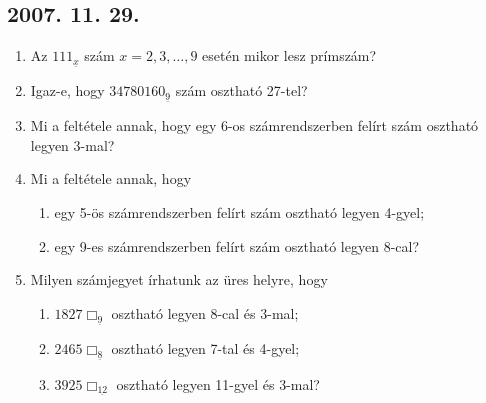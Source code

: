 \documentclass{article}
\newenvironment{abc}{\begin{enumerate}[label=\textit{\alph*})]}{\end{enumerate}}
\begin{document}
\subsection*{2007. 11. 29.}
\begin{enumerate}
\item Az $111_{\underline{x}}$ szám $x=2, 3, \ldots , 9$ esetén mikor lesz prímszám?
\item Igaz-e, hogy $34780160_{\underline{9}}$ szám osztható 27-tel?
\item Mi a feltétele annak, hogy egy 6-os számrendszerben felírt szám osztható legyen 3-mal?
\item Mi a feltétele annak, hogy
\begin{abc}
\item egy 5-ös számrendszerben felírt szám osztható legyen 4-gyel;
\item egy 9-es számrendszerben felírt szám osztható legyen 8-cal?
\end{abc}
\item Milyen számjegyet írhatunk az üres helyre, hogy
\begin{abc}
\item $1827\Box_{\underline{9}}$ osztható legyen 8-cal és 3-mal;
\item $2465\Box_{\underline{8}}$ osztható legyen 7-tal és 4-gyel;
\item $3925\Box_{\underline{12}}$ osztható legyen 11-gyel és 3-mal?
\end{abc}
\end{enumerate}
\end{document}
